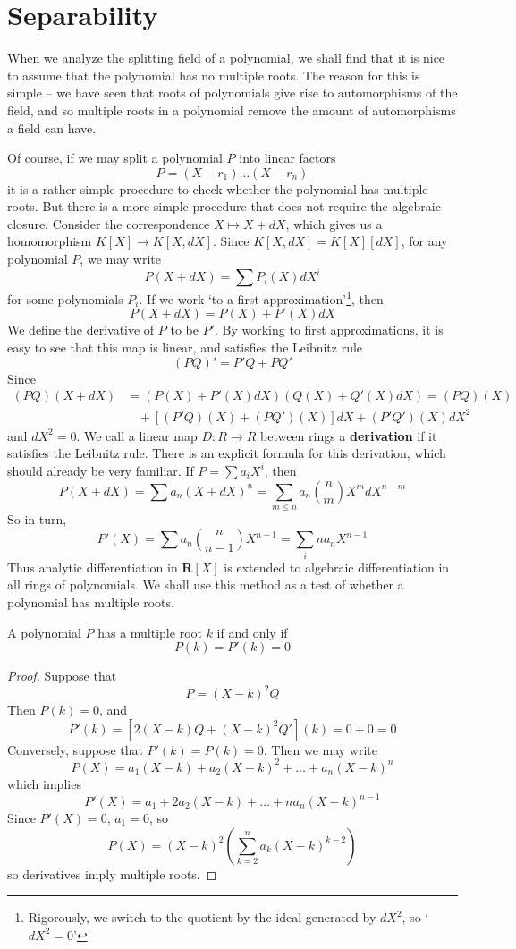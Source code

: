\section{Separability}

When we analyze the splitting field of a polynomial, we shall find that it is nice to assume that the polynomial has no multiple roots. The reason for this is simple -- we have seen that roots of polynomials give rise to automorphisms of the field, and so multiple roots in a polynomial remove the amount of automorphisms a field can have.

Of course, if we may split a polynomial $P$ into linear factors
%
\[ P = (X - r_1) \dots (X - r_n) \]
%
it is a rather simple procedure to check whether the polynomial has multiple roots. But there is a more simple procedure that does not require the algebraic closure. Consider the correspondence $X \mapsto X + dX$, which gives us a homomorphism $K[X] \to K[X,dX]$. Since $K[X,dX] = K[X][dX]$, for any polynomial $P$, we may write
%
\[ P(X + dX) = \sum P_i(X) dX^i \]
%
for some polynomials $P_i$. If we work `to a first approximation'\footnote{Rigorously, we switch to the quotient by the ideal generated by $dX^2$, so `$dX^2 = 0$'}, then
%
\[ P(X + dX) = P(X) + P'(X) dX \]
%
We define the derivative of $P$ to be $P'$. By working to first approximations, it is easy to see that this map is linear, and satisfies the Leibnitz rule
%
\[ (PQ)' = P'Q + PQ' \]
%
Since
%
\begin{align*}
    (PQ)(X + dX) &= (P(X) + P'(X)dX)(Q(X) + Q'(X)dX) = (PQ)(X)\\
    &\ \ \ \ + [(P'Q)(X) + (PQ')(X)]dX + (P'Q')(X) dX^2
\end{align*}
%
and $dX^2 = 0$. We call a linear map $D: R \to R$ between rings a {\bf derivation} if it satisfies the Leibnitz rule. There is an explicit formula for this derivation, which should already be very familiar. If $P = \sum a_i X^i$, then
%
\[ P(X + dX) = \sum a_n (X + dX)^n = \sum_{m \leq n} a_n \binom{n}{m} X^m dX^{n-m} \]
%
So in turn,
%
\[ P'(X) = \sum a_n \binom{n}{n-1} X^{n-1} = \sum_i n a_n X^{n-1} \]
%
Thus analytic differentiation in $\mathbf{R}[X]$ is extended to algebraic differentiation in all rings of polynomials. We shall use this method as a test of whether a polynomial has multiple roots.

\begin{prop}
    A polynomial $P$ has a multiple root $k$ if and only if
    \[ P(k) = P'(k) = 0 \]
\end{prop}
\begin{proof}
    Suppose that
    \[ P = (X - k)^2 Q \]
    Then $P(k) = 0$, and
    \[ P'(k) = [2 (X - k) Q + (X - k)^2 Q'](k) = 0 + 0 = 0 \]
    Conversely, suppose that $P'(k) = P(k) = 0$. Then we may write
    \[ P(X) = a_1 (X - k) + a_2 (X - k)^2 + \dots + a_n (X - k)^n \]
    which implies
    \[ P'(X) = a_1 + 2 a_2 (X - k) + \dots + n a_n (X - k)^{n-1} \]
    Since $P'(X) = 0$, $a_1 = 0$, so
    \[ P(X) = (X - k)^2 \left( \sum_{k = 2}^n a_k (X - k)^{k-2} \right) \]
    so derivatives imply multiple roots.
\end{proof}

